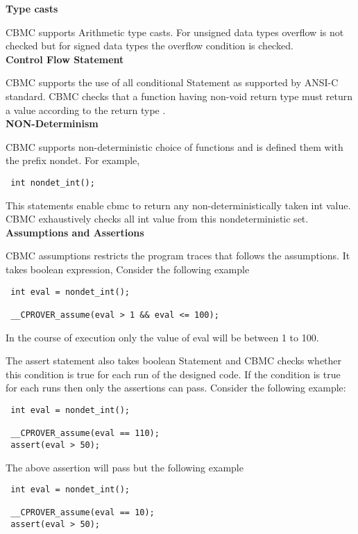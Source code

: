 \textbf{Type casts}
 
CBMC supports Arithmetic type casts. For unsigned data types overflow is not 
checked but for signed data types the overflow condition is checked. \\

\textbf{Control Flow Statement}
 
CBMC supports the use of all conditional Statement as supported by ANSI-C standard.
CBMC checks that a function having non-void return type must return a value 
according to the return type . \\
 
\textbf{NON-Determinism}
 
CBMC supports non-deterministic choice of functions and is defined them with 
the prefix nondet. For example,
\begin{verbatim}
 int nondet_int();
\end{verbatim}

This statements enable cbmc to return any non-deterministically taken int value.
CBMC exhaustively checks all int value from this nondeterministic set. \\


\textbf{Assumptions and Assertions}

CBMC assumptions restricts the program traces that follows the assumptions.
It takes boolean expression, Consider the following example
 
\begin{verbatim}
 int eval = nondet_int();
  
 __CPROVER_assume(eval > 1 && eval <= 100);
\end{verbatim}
In the course of execution only the value of eval will be between 1 to 100.
 
The assert statement also takes boolean Statement and CBMC checks whether this
condition is true for each run of the designed code. If the condition is true 
for each runs then only the assertions can pass. Consider the following example:
 
\begin{verbatim}
 int eval = nondet_int();
  
 __CPROVER_assume(eval == 110);
 assert(eval > 50);
\end{verbatim}
 
The above assertion will pass but the following example

\begin{verbatim}
 int eval = nondet_int();
  
 __CPROVER_assume(eval == 10);
 assert(eval > 50);
\end{verbatim}
 
